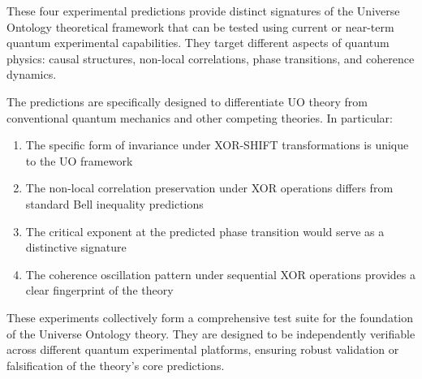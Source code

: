 These four experimental predictions provide distinct signatures of the Universe Ontology theoretical framework that can be tested using current or near-term quantum experimental capabilities. They target different aspects of quantum physics: causal structures, non-local correlations, phase transitions, and coherence dynamics.

The predictions are specifically designed to differentiate UO theory from conventional quantum mechanics and other competing theories. In particular:

\begin{enumerate}
\item The specific form of invariance under XOR-SHIFT transformations is unique to the UO framework
\item The non-local correlation preservation under XOR operations differs from standard Bell inequality predictions
\item The critical exponent at the predicted phase transition would serve as a distinctive signature
\item The coherence oscillation pattern under sequential XOR operations provides a clear fingerprint of the theory
\end{enumerate}

These experiments collectively form a comprehensive test suite for the foundation of the Universe Ontology theory. They are designed to be independently verifiable across different quantum experimental platforms, ensuring robust validation or falsification of the theory's core predictions. 